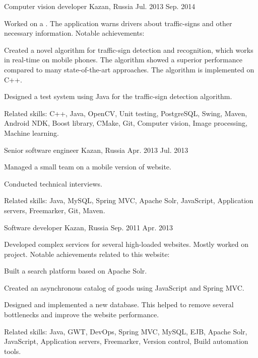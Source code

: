 \begin{cventries}
  \cventry
    {Computer vision developer} %
    {} %
    {Kazan, Russia} %
    {Jul. 2013 \textemdash{} Sep. 2014} %
    {
    Worked on a . The application warns drivers about traffic-signs and other necessary information. Notable achievements:
      \begin{cvitems}
      \item{Created a novel algorithm for traffic-sign detection and recognition, which works in real-time on mobile phones. The algorithm showed a superior performance compared to many state-of-the-art approaches. The algorithm is implemented on C++.}
      \item{Designed a test system using Java for the traffic-sign detection algorithm.}
      \end{cvitems}
      Related skills: C++, Java, OpenCV, Unit testing, PostgreSQL, Swing, Maven, Android NDK, Boost library, CMake, Git, Computer vision, Image processing, Machine learning.
    }

  \cventry
    {Senior software engineer} %
    {} %
    {Kazan, Russia} %
    {Apr. 2013 \textemdash{} Jul. 2013} %
    {
      \begin{cvitems_up}
      \item{Managed a small team on a mobile version of  website.}
      \item{Conducted technical interviews.}
      \end{cvitems_up}
      Related skills: Java, MySQL, Spring MVC, Apache Solr, JavaScript, Application servers, Freemarker, Git, Maven.
    }

  \cventry
    {Software developer} %
    {} %
    {Kazan, Russia} %
    {Sep. 2011 \textemdash{} Apr. 2013} %
    {
    Developed complex services for several high-loaded websites. Mostly worked on  project. Notable achievements related to this website:
      \begin{cvitems}
      \item{Built a search platform based on Apache Solr.}
      \item{Created an asynchronous catalog of goods using JavaScript and Spring MVC.}
      \item{Designed and implemented a new database. This helped to remove several bottlenecks and improve the website performance.}
      \end{cvitems}
	Related skills: Java, GWT, DevOps, Spring MVC, MySQL, EJB, Apache Solr, JavaScript, Application servers, Freemarker, Version control, Build automation tools.
    }
\end{cventries}

